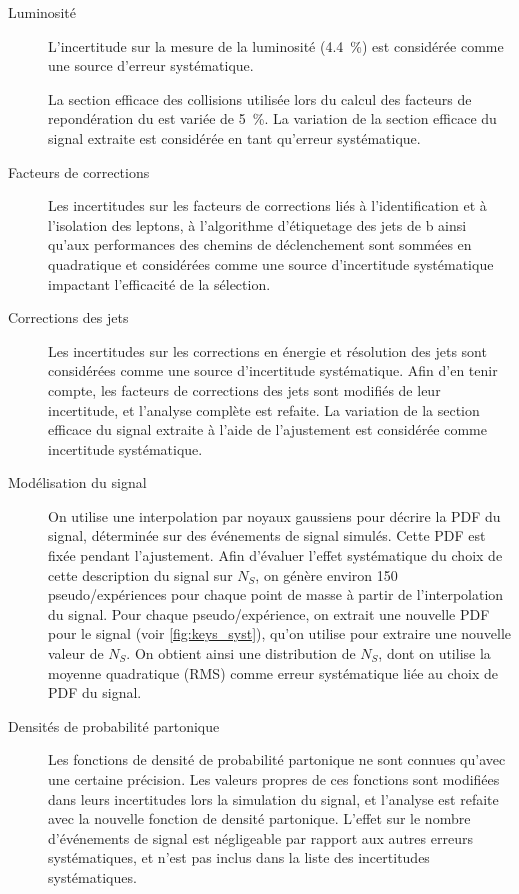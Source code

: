 \begin{description}
  \item[Luminosité] L'incertitude sur la mesure de la luminosité (\SI{4.4}{\percent}) est considérée comme une source d'erreur systématique.
  \item[\pu] La section efficace des collisions \Pproton{}\Pproton{} utilisée lors du calcul des facteurs de repondération du \pu est variée de \pm{} \SI{5}{\percent}. La variation de la section efficace du signal extraite est considérée en tant qu'erreur systématique.
  \item[Facteurs de corrections] Les incertitudes sur les facteurs de corrections liés à l’identification et à l’isolation des leptons, à l’algorithme d’étiquetage des jets de b ainsi qu’aux performances des chemins de déclenchement sont sommées en quadratique et considérées comme une source d’incertitude systématique impactant l'efficacité de la sélection.
  \item[Corrections des jets] Les incertitudes sur les corrections en énergie et résolution des jets sont considérées comme une source d’incertitude systématique. Afin d'en tenir compte, les facteurs de corrections des jets sont modifiés de \pm{} leur incertitude, et l'analyse complète est refaite. La variation de la section efficace du signal extraite à l'aide de l'ajustement est considérée comme incertitude systématique.
  \item[Modélisation du signal] On utilise une interpolation par noyaux gaussiens pour décrire la PDF du signal, déterminée sur des événements de signal simulés. Cette PDF est fixée pendant l'ajustement. Afin d'évaluer l'effet systématique du choix de cette description du signal sur $N_S$, on génère environ 150 pseudo\-/expériences pour chaque point de masse à partir de l'interpolation du signal. Pour chaque pseudo\-/expérience, on extrait une nouvelle PDF pour le signal (voir \cref{fig:keys_syst}), qu'on utilise pour extraire une nouvelle valeur de $N_S$. On obtient ainsi une distribution de $N_S$, dont on utilise la moyenne quadratique (RMS) comme erreur systématique liée au choix de PDF du signal.
  \item[Densités de probabilité partonique] Les fonctions de densité de probabilité partonique ne sont connues qu'avec une certaine précision. Les valeurs propres de ces fonctions sont modifiées dans leurs incertitudes lors la simulation du signal, et l'analyse est refaite avec la nouvelle fonction de densité partonique. L'effet sur le nombre d'événements de signal est négligeable par rapport aux autres erreurs systématiques, et n'est pas inclus dans la liste des incertitudes systématiques.
\end{description}

